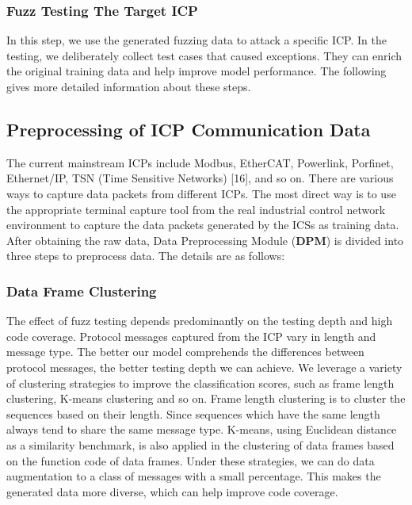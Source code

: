 \subsubsection{Fuzz Testing The Target ICP}
In this step, we use the generated fuzzing data to attack a specific ICP. In the testing, we deliberately collect test cases that caused exceptions. They can enrich the original training data and help improve model performance. The following gives more detailed information about these steps.

\subsection{Preprocessing of ICP Communication Data}   %
The current mainstream ICPs include Modbus, EtherCAT, Powerlink, Porfinet, Ethernet/IP, TSN (Time Sensitive Networks) [16], and so on. There are various ways to capture data packets from different ICPs. The most direct way is to use the appropriate terminal capture tool from the real industrial control network environment to capture the data packets generated by the ICSs as training data. After obtaining the raw data, Data Preprocessing Module (\textbf{DPM}) is divided into three steps to preprocess data. The details are as follows:

\subsubsection{Data Frame Clustering}
The effect of fuzz testing depends predominantly on the testing depth and high code coverage. Protocol messages captured from the ICP vary in length and message type. The better our model comprehends the differences between protocol messages, the better testing depth we can achieve. We leverage a variety of clustering strategies to improve the classification scores, such as frame length clustering, K-means clustering and so on. Frame length clustering is to cluster the sequences based on their length. Since sequences which have the same length always tend to share the same message type. K-means, using Euclidean distance as a similarity benchmark, is also applied in the clustering of data frames based on the function code of data frames. Under these strategies, we can do data augmentation to a class of messages with a small percentage. This makes the generated data more diverse, which can help improve code coverage.

